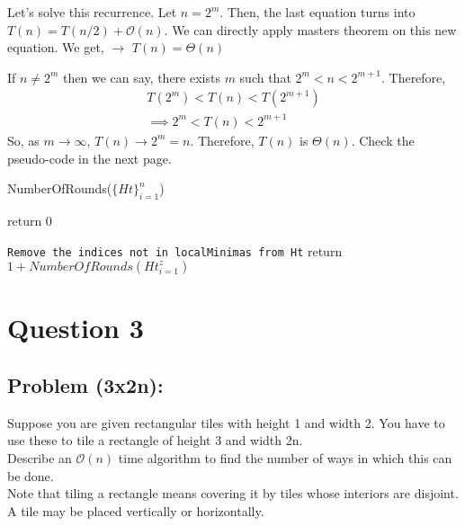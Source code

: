 \documentclass[11pt, fleqn]{article}
\begin{document}
\begin{enumerate}
    Let's solve this recurrence. Let $n=2^m$. Then, the last equation turns into $T(n) = T(n/2) + \mathcal{O}(n)$. We can directly apply masters theorem on this new equation. We get, $\longrightarrow$ $T(n) = \Theta(n)$
    \medskip
     
    If $n \neq 2^m$ then we can say, there exists $m$ such that $2^m < n < 2^{m+1}$. Therefore,%
    \begin{gather*}
        T(2^m) < T(n) < T(2^{m+1})\\
        \implies 2^m < T(n) < 2^{m+1}
    \end{gather*}
    So, as $m \longrightarrow \infty$, $T(n) \longrightarrow 2^m = n$. Therefore, $T(n)$ is $\Theta(n)$. Check the pseudo-code in the next page.\\
    
    \begin{algorithm}[H]
        \SetAlgoLined
        \DontPrintSemicolon
        \caption{NumberOfRounds($\{Ht\}_{i=1}^{n}$)}
         {
            return 0\;
        }
        
        
        
        \texttt{Remove the indices not in localMinimas from Ht}\;
        return $1 + NumberOfRounds({Ht}_{i=1}^{z})$\;
    \end{algorithm}
    
\end{enumerate}


\newpage 
\section*{Question 3}
\label{q3}
\setcounter{equation}{0}

\subsection*{Problem (3x2n):}
Suppose you are given rectangular tiles with height 1 and width 2. You have to use these to tile a rectangle of height 3 and width 2n. \\
Describe an $\mathcal{O}(n)$ time algorithm to find the number of ways in which this can be done. \\
Note that tiling a rectangle means covering it by tiles whose interiors are disjoint. A tile may be placed vertically or horizontally. 
\end{document}
